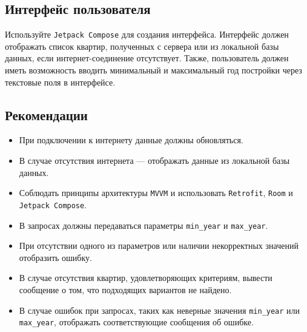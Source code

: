 \subsection{Интерфейс пользователя}
Используйте \texttt{Jetpack Compose} для создания интерфейса. Интерфейс должен отображать список квартир, полученных с сервера или из локальной базы данных, если интернет-соединение отсутствует. Также, пользователь должен иметь возможность вводить минимальный и максимальный год постройки через текстовые поля в интерфейсе.

\subsection{Рекомендации}
\begin{itemize}
  \item При подключении к интернету данные должны обновляться.
  \item В случае отсутствия интернета — отображать данные из локальной базы данных.
  \item Соблюдать принципы архитектуры \texttt{MVVM} и использовать \texttt{Retrofit}, \texttt{Room} и \texttt{Jetpack Compose}.
  \item В запросах должны передаваться параметры \texttt{min\_year} и \texttt{max\_year}.
  \item При отсутствии одного из параметров или наличии некорректных значений отобразить ошибку.
  \item В случае отсутствия квартир, удовлетворяющих критериям, вывести сообщение о том, что подходящих вариантов не найдено.
  \item В случае ошибок при запросах, таких как неверные значения \texttt{min\_year} или \texttt{max\_year}, отображать соответствующие сообщения об ошибке.
\end{itemize}
